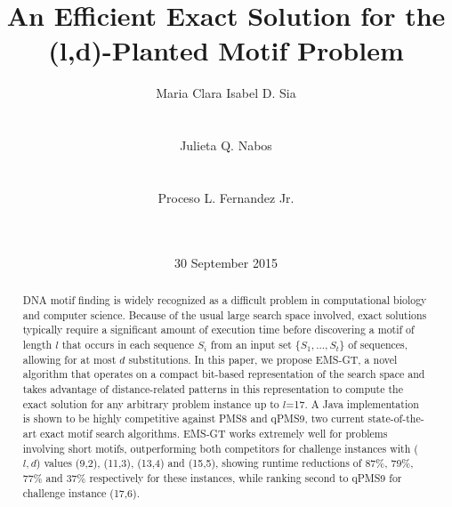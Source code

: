 \documentclass{acm_proc_article-sp}
\begin{document}
\title{An Efficient Exact Solution for the (l,d)-Planted Motif Problem}
\author{
	\alignauthor
	Maria Clara Isabel D. Sia\\ %
		\\
	    \\
	\alignauthor
	Julieta Q. Nabos\\
		\\
		\\
	\alignauthor
	Proceso L. Fernandez Jr.\\
		\\
		\\
	}
\date{30 September 2015}
\maketitle

\begin{abstract}
	DNA motif finding is widely recognized as a difficult problem in computational biology and computer science. Because of the usual large search space involved, exact solutions typically require a significant amount of execution time before discovering a motif of length $l$ that occurs in each sequence $S_{i}$ from an input set $\{S_{1} ,...,S_{t}\}$ of sequences, allowing for at most $d$ substitutions. In this paper, we propose EMS-GT, a novel algorithm that operates on a compact bit-based representation of the search space and takes advantage of distance-related patterns in this representation to compute the exact solution for any arbitrary problem instance up to $l$=17. A Java implementation
	is shown to be highly competitive against PMS8 and qPMS9, two current state-of-the-art exact motif search algorithms. EMS-GT works extremely well for problems involving short motifs, outperforming both competitors for challenge instances with ($l,d$) values (9,2), (11,3), (13,4) and (15,5), showing runtime reductions of 87\%, 79\%, 77\% and 37\% respectively for these instances, while ranking second to qPMS9 for challenge instance (17,6).
\end{abstract}
\end{document}
